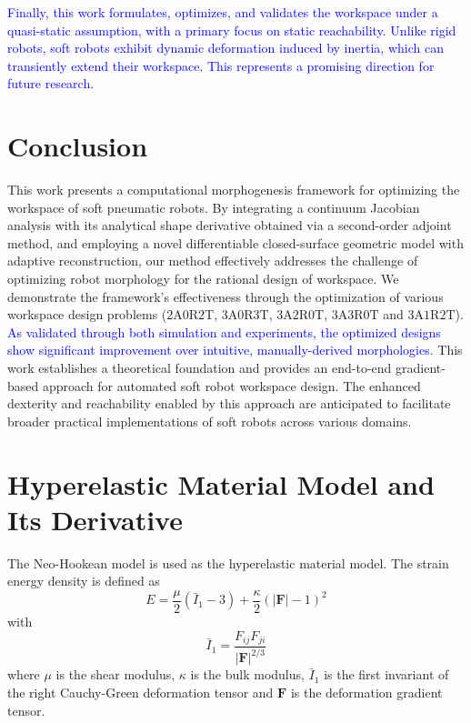 \documentclass[journal]{IEEEtran}
\theoremstyle{definition}
\begin{document}
\textcolor{blue}{Finally, this work formulates, optimizes, and validates the workspace under a quasi-static assumption, with a primary focus on static reachability. Unlike rigid robots, soft robots exhibit dynamic deformation induced by inertia, which can transiently extend their workspace. This represents a promising direction for future research.}

\section{Conclusion}
\label{sec:conclusion}

This work presents a computational morphogenesis framework for optimizing the workspace of soft pneumatic robots. By integrating a continuum Jacobian analysis with its analytical shape derivative obtained via a second-order adjoint method, and employing a novel differentiable closed-surface geometric model with adaptive reconstruction, our method effectively addresses the challenge of optimizing robot morphology for the rational design of workspace. We demonstrate the framework's effectiveness through the optimization of various workspace design problems ($2\text{A}0\text{R}2\text{T}$, $3\text{A}0\text{R}3\text{T}$, $3\text{A}2\text{R}0\text{T}$, $3\text{A}3\text{R}0\text{T}$ and $3\text{A}1\text{R}2\text{T}$). \textcolor{blue}{As validated through both simulation and experiments, the optimized designs show significant improvement over intuitive, manually-derived morphologies.} This work establishes a theoretical foundation and provides an end-to-end gradient-based approach for automated soft robot workspace design. The enhanced dexterity and reachability enabled by this approach are anticipated to facilitate broader practical implementations of soft robots across various domains.


\appendices

\section{Hyperelastic Material Model and Its Derivative}
\label{sec:material_model}
The Neo-Hookean model is used as the hyperelastic material model. The strain energy density is defined as
\begin{equation}
  E = \frac{\mu}{2} \left( \bar{I}_1 - 3 \right) + \frac{\kappa}{2} \left( \left|\mathbf{F}\right| - 1 \right)^2
\end{equation}
with
\begin{equation}
  \bar{I}_1 = \frac{F_{ij}F_{ji}}{\left|\mathbf{F}\right|^{2/3}}
\end{equation}
where $\mu$ is the shear modulus, $\kappa$ is the bulk modulus, $\bar{I}_1$ is the first invariant of the right Cauchy-Green deformation tensor and $\mathbf{F}$ is the deformation gradient tensor.
\end{document}
